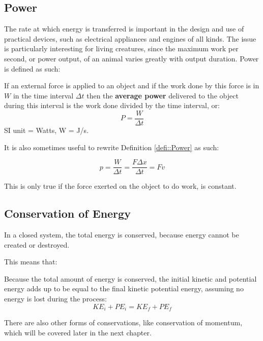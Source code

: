 \subsection{Power}

The rate at which energy is transferred is important in the design and use of practical devices, such as electrical appliances and engines of all kinds. The issue is particularly interesting for living creatures, since the maximum work per second, or power output, of an animal varies greatly with output duration. Power is defined as such:

\begin{defi}\label{defi::Power}
If an external force is applied to an object and if the work done by this force is in $W$ in the time interval $\Delta t$ then the \textbf{average power} delivered to the object during this interval is the work done divided by the time interval, or:
$$P=\frac{W}{\Delta t}$$
SI unit = Watts, W = J/s.
\end{defi}
 
 It is also sometimes useful to rewrite Definition \ref{defi::Power} as such:
 \begin{form}
 $$p=\frac{W}{\Delta t} = \frac{F \Delta x}{\Delta t} = Fv$$
 \end{form}

This is only true if the force exerted on the object to do work, is constant.
 
 \subsection{Conservation of Energy}
 In a closed system, the total energy is conserved, because energy cannot be created or destroyed.
 
 This means that:
 \begin{defi}
 Because the total amount of energy is conserved, the initial kinetic and potential energy adds up to be equal to the final kinetic potential energy, assuming no energy is lost during the process:
 $$KE_i + PE_i = KE_f + PE_f$$
 \end{defi}
 
 There are also other forms of conservations, like conservation of momentum, which will be covered later in the next chapter.